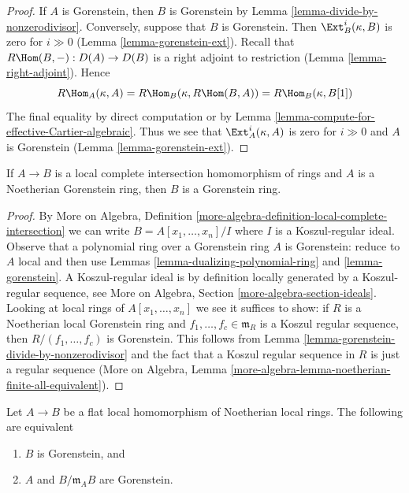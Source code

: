 \begin{proof}
If $A$ is Gorenstein, then $B$ is Gorenstein by
Lemma \ref{lemma-divide-by-nonzerodivisor}.
Conversely, suppose that $B$ is Gorenstein. Then
$\Ext^i_B(\kappa, B)$ is zero for $i \gg 0$
(Lemma \ref{lemma-gorenstein-ext}).
Recall that $R\Hom(B, -) : D(A) \to D(B)$ is a right adjoint
to restriction (Lemma \ref{lemma-right-adjoint}).
Hence
$$
R\Hom_A(\kappa, A) = R\Hom_B(\kappa, R\Hom(B, A)) =
R\Hom_B(\kappa, B[1])
$$
The final equality by direct computation or by
Lemma \ref{lemma-compute-for-effective-Cartier-algebraic}.
Thus we see that $\Ext^i_A(\kappa, A)$ is zero for
$i \gg 0$ and $A$ is Gorenstein (Lemma \ref{lemma-gorenstein-ext}).
\end{proof}

\begin{lemma}
\label{lemma-gorenstein-lci}
If $A \to B$ is a local complete intersection homomorphism of rings and
$A$ is a Noetherian Gorenstein ring, then $B$ is a Gorenstein ring.
\end{lemma}

\begin{proof}
By More on Algebra, Definition
\ref{more-algebra-definition-local-complete-intersection}
we can write $B = A[x_1, \ldots, x_n]/I$
where $I$ is a Koszul-regular ideal. Observe that a polynomial
ring over a Gorenstein ring $A$ is Gorenstein: reduce to
$A$ local and then use Lemmas \ref{lemma-dualizing-polynomial-ring} and
\ref{lemma-gorenstein}.
A Koszul-regular ideal is by definition locally generated
by a Koszul-regular sequence, see More on Algebra, Section
\ref{more-algebra-section-ideals}.
Looking at local rings of $A[x_1, \ldots, x_n]$
we see it suffices to show: if $R$ is a Noetherian local
Gorenstein ring and $f_1, \ldots, f_c \in \mathfrak m_R$
is a Koszul regular sequence, then $R/(f_1, \ldots, f_c)$ is Gorenstein.
This follows from
Lemma \ref{lemma-gorenstein-divide-by-nonzerodivisor} and
the fact that a Koszul regular sequence in $R$ is just a
regular sequence (More on Algebra, Lemma
\ref{more-algebra-lemma-noetherian-finite-all-equivalent}).
\end{proof}

\begin{lemma}
\label{lemma-flat-under-gorenstein}
Let $A \to B$ be a flat local homomorphism of Noetherian local rings.
The following are equivalent
\begin{enumerate}
\item $B$ is Gorenstein, and
\item $A$ and $B/\mathfrak m_A B$ are Gorenstein.
\end{enumerate}
\end{lemma}

